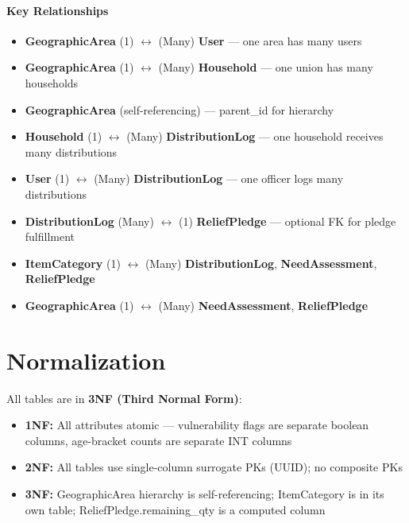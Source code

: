 \paragraph{Key Relationships}

\begin{itemize}[nosep]
    \item \textbf{GeographicArea} (1) $\longleftrightarrow$ (Many) \textbf{User} --- one area has many users
    \item \textbf{GeographicArea} (1) $\longleftrightarrow$ (Many) \textbf{Household} --- one union has many households
    \item \textbf{GeographicArea} (self-referencing) --- parent\_id for hierarchy
    \item \textbf{Household} (1) $\longleftrightarrow$ (Many) \textbf{DistributionLog} --- one household receives many distributions
    \item \textbf{User} (1) $\longleftrightarrow$ (Many) \textbf{DistributionLog} --- one officer logs many distributions
    \item \textbf{DistributionLog} (Many) $\longleftrightarrow$ (1) \textbf{ReliefPledge} --- optional FK for pledge fulfillment
    \item \textbf{ItemCategory} (1) $\longleftrightarrow$ (Many) \textbf{DistributionLog}, \textbf{NeedAssessment}, \textbf{ReliefPledge}
    \item \textbf{GeographicArea} (1) $\longleftrightarrow$ (Many) \textbf{NeedAssessment}, \textbf{ReliefPledge}
\end{itemize}

\section{Normalization}
All tables are in \textbf{3NF (Third Normal Form)}:

\begin{itemize}[nosep]
    \item \textbf{1NF:} All attributes atomic --- vulnerability flags are separate boolean columns, age-bracket counts are separate INT columns
    \item \textbf{2NF:} All tables use single-column surrogate PKs (UUID); no composite PKs
    \item \textbf{3NF:} GeographicArea hierarchy is self-referencing; ItemCategory is in its own table; ReliefPledge.remaining\_qty is a computed column
\end{itemize}

